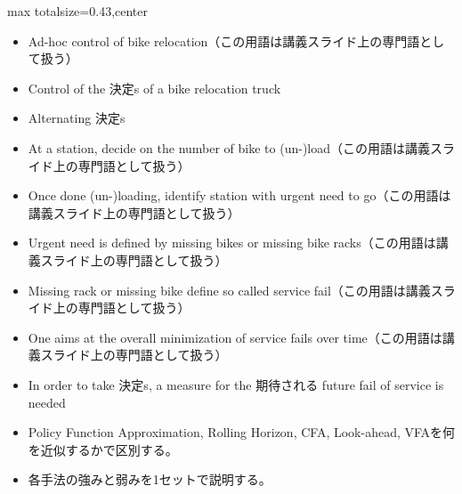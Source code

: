 \clearpage
{}
\begin{minipage}[t]{0.405\textwidth}
\begin{adjustbox}{max totalsize={\textwidth}{0.43\textheight},center}
\begin{minipage}{\textwidth}\scriptsize
{}\begin{itemize}
\item Ad-hoc control of bike relocation（この用語は講義スライド上の専門語として扱う）
\item Control of the 決定s of a bike relocation truck
\item Alternating 決定s
\item At a station, decide on the number of bike to (un-)load（この用語は講義スライド上の専門語として扱う）
\item Once done (un-)loading, identify station with urgent need to go（この用語は講義スライド上の専門語として扱う）
\item Urgent need is defined by missing bikes or missing bike racks（この用語は講義スライド上の専門語として扱う）
\item Missing rack or missing bike define so called service fail（この用語は講義スライド上の専門語として扱う）
\item One aims at the overall minimization of service fails over time（この用語は講義スライド上の専門語として扱う）
\item In order to take 決定s, a measure for the 期待される future fail of service is needed
\end{itemize}\begin{itemize}
\item Policy Function Approximation, Rolling Horizon, CFA, Look-ahead, VFAを何を近似するかで区別する。
\item 各手法の強みと弱みを1セットで説明する。
\end{itemize}
\end{minipage}
\end{adjustbox}
\end{minipage}\hfill

